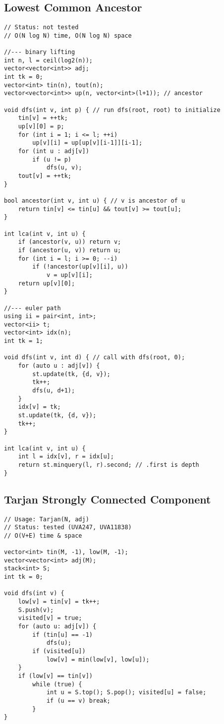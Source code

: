 \documentclass[12pt, a4paper, twoside]{article}
\begin{document}
\subsection{Lowest Common Ancestor}
\begin{lstlisting}
// Status: not tested
// O(N log N) time, O(N log N) space

//--- binary lifting
int n, l = ceil(log2(n));
vector<vector<int>> adj;
int tk = 0;
vector<int> tin(n), tout(n);
vector<vector<int>> up(n, vector<int>(l+1)); // ancestor

void dfs(int v, int p) { // run dfs(root, root) to initialize
	tin[v] = ++tk;
	up[v][0] = p;
	for (int i = 1; i <= l; ++i)
		up[v][i] = up[up[v][i-1]][i-1];
	for (int u : adj[v])
		if (u != p)
			dfs(u, v);
	tout[v] = ++tk;
}

bool ancestor(int v, int u) { // v is ancestor of u
	return tin[v] <= tin[u] && tout[v] >= tout[u];
}

int lca(int v, int u) {
	if (ancestor(v, u)) return v;
	if (ancestor(u, v)) return u;
	for (int i = l; i >= 0; --i)
		if (!ancestor(up[v][i], u))
			v = up[v][i];
	return up[v][0];
}

//--- euler path
using ii = pair<int, int>;
vector<ii> t;
vector<int> idx(n);
int tk = 1;

void dfs(int v, int d) { // call with dfs(root, 0);
	for (auto u : adj[v]) {
		st.update(tk, {d, v});
		tk++;
		dfs(u, d+1);
	}
	idx[v] = tk;
	st.update(tk, {d, v});
	tk++;
}

int lca(int v, int u) {
	int l = idx[v], r = idx[u];
	return st.minquery(l, r).second; // .first is depth
}
\end{lstlisting}

\subsection{Tarjan Strongly Connected Component}
\begin{lstlisting}
// Usage: Tarjan(N, adj)
// Status: tested (UVA247, UVA11838)
// O(V+E) time & space

vector<int> tin(M, -1), low(M, -1);
vector<vector<int> adj(M);
stack<int> S;
int tk = 0;

void dfs(int v) {
	low[v] = tin[v] = tk++;
	S.push(v);
	visited[v] = true;
	for (auto u: adj[v]) {
		if (tin[u] == -1)
			dfs(u);
		if (visited[u])
			low[v] = min(low[v], low[u]);
	}
	if (low[v] == tin[v])
		while (true) {
			int u = S.top(); S.pop(); visited[u] = false;
			if (u == v) break;
		}
}
\end{lstlisting}
\end{document}
